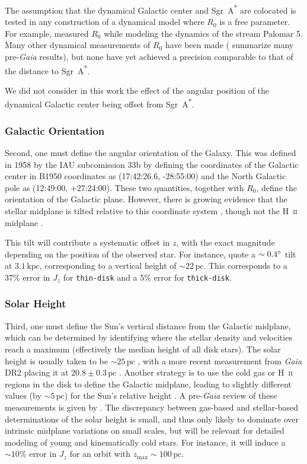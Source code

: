 \documentclass[twocolumn]{aastex62}
\newcommand{\pc}{\text{pc}}
\newcommand{\kpc}{\text{kpc}}
\newcommand{\sgra}{Sgr~A\textsuperscript{*}}
\newcommand{\thin}{\texttt{thin-disk}}
\newcommand{\thick}{\texttt{thick-disk}}
\begin{document}
The assumption that the dynamical Galactic center and \sgra{} are colocated is
tested in any construction of a dynamical model where $R_0$ is a free
parameter. For example, \citet{2015ApJ...803...80K} measured $R_0$ while
modeling the dynamics of the stream Palomar 5. Many other dynamical
measurements of $R_0$ have been made (\citealt{2016ARAA..54..529B} summarize
many pre-\textit{Gaia} results), but none have yet achieved a precision
comparable to that of the distance to \sgra{}.

We did not consider in this work the effect of the angular position of the
dynamical Galactic center being offset from \sgra{}.

\subsubsection{Galactic Orientation}
Second, one must define the angular orientation of the Galaxy. This was
defined in 1958 by the IAU subcomission 33b \citep{1960MNRAS.121..123B} by
defining the coordinates of the Galactic center in B1950 coordinates as
(17:42:26.6, -28:55:00) and the North Galactic pole as (12:49:00, +27:24:00).
These two quantities, together with $R_0$, define the orientation of the
Galactic plane. However, there is growing evidence that the stellar midplane
is tilted relative to this coordinate system \citep{2014ApJ...797...53G,
2016ARAA..54..529B}, though not the H~\textsc{ii} midplane
\citep{2019ApJ...871..145A}.

This tilt will contribute a systematic offset in $z$, with the exact magnitude
depending on the position of the observed star. For instance,
\citet{2014ApJ...797...53G} quote a $\sim0.4\degree$ tilt at $3.1\,\kpc$,
corresponding to a vertical height of $\sim22\,\pc$. This corresponds to a
$37\%$ error in $J_z$ for \thin{} and a 5\% error for \thick{}.

\subsubsection{Solar Height}
Third, one must define the Sun's vertical distance from the Galactic midplane,
which can be determined by identifying where the stellar density and
velocities reach a maximum (effectively the median height of all disk stars).
The solar height is usually taken to be $\sim 25\,\pc$
\citep{2001ApJ...553..184C}, with a more recent measurement from \textit{Gaia}
DR2 placing it at $20.8 \pm 0.3\,\pc$ \citep{2019MNRAS.482.1417B}. Another
strategy is to use the cold gas or H~\textsc{ii} regions in the disk to define
the Galactic midplane, leading to slightly different values (by $\sim 5\,\pc$)
for the Sun's relative height \citep[e.g.,][]{2019ApJ...871..145A}. A
pre-\textit{Gaia} review of these measurements is given by
\citet{2016ARAA..54..529B}. The discrepancy between gas-based and
stellar-based determinations of the solar height is small, and thus only
likely to dominate over intrinsic midplane variations on small scales, but
will be relevant for detailed modeling of young and kinematically cold stars.
For instance, it will induce a $\sim10\%$ error in $J_z$ for an orbit with
$z_{\text{max}}\sim100\,\pc$.
\end{document}
